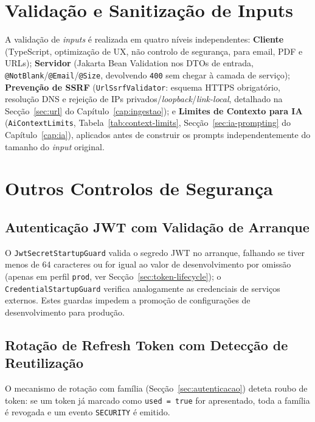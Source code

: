 \section{Validação e Sanitização de Inputs} \label{sec:validacao}

A validação de \textit{inputs} é realizada em quatro níveis independentes: \textbf{Cliente} (TypeScript, optimização de UX, não controlo de segurança, para email, PDF e URLs); \textbf{Servidor} (Jakarta Bean Validation nos DTOs de entrada, \texttt{@NotBlank}/\texttt{@Email}/\texttt{@Size}, devolvendo \texttt{400} sem chegar à camada de serviço); \textbf{Prevenção de SSRF} (\texttt{UrlSsrfValidator}: esquema HTTPS obrigatório, resolução DNS e rejeição de IPs privados/\textit{loopback}/\textit{link-local}, detalhado na Secção~\ref{sec:url} do Capítulo~\ref{cap:ingestao}); e \textbf{Limites de Contexto para IA} (\texttt{AiContextLimits}, Tabela~\ref{tab:context-limits}, Secção~\ref{sec:ia-prompting} do Capítulo~\ref{cap:ia}), aplicados antes de construir os prompts independentemente do tamanho do \textit{input} original.

\section{Outros Controlos de Segurança} \label{sec:outros-seguranca}

\subsection*{Autenticação JWT com Validação de Arranque}

O \texttt{JwtSecretStartupGuard} valida o segredo JWT no arranque, falhando se tiver menos de 64 caracteres ou for igual ao valor de desenvolvimento por omissão (apenas em perfil \texttt{prod}, ver Secção~\ref{sec:token-lifecycle}); o \texttt{CredentialStartupGuard} verifica analogamente as credenciais de serviços externos. Estes guardas impedem a promoção de configurações de desenvolvimento para produção.

\subsection*{Rotação de Refresh Token com Detecção de Reutilização}

O mecanismo de rotação com família (Secção~\ref{sec:autenticacao}) deteta roubo de token: se um token já marcado como \texttt{used = true} for apresentado, toda a família é revogada e um evento \texttt{SECURITY} é emitido.

